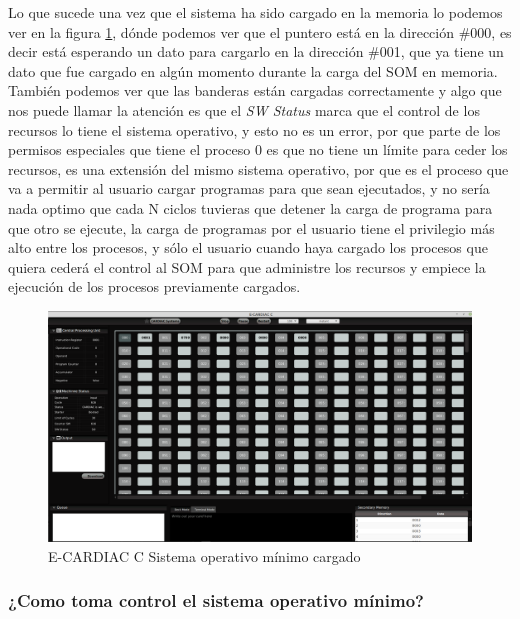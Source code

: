 \documentclass[letterpaper,12pt,oneside]{book}
\begin{document}
		Lo que sucede una vez que el sistema ha sido cargado en la memoria lo podemos ver en la figura \ref{fig:eccSOMcargado}, dónde podemos ver que el
		puntero está en la dirección \#000, es decir está esperando un dato para cargarlo en la dirección \#001, que ya tiene un dato que fue cargado
		en algún momento durante la carga del SOM en memoria. También podemos ver que las banderas están cargadas correctamente y algo que nos puede llamar la atención
		es que el \textit{SW Status} marca que el control de los recursos lo tiene el sistema operativo, y esto no es un error, por que parte de los permisos especiales
		que tiene el proceso 0 es que no tiene un límite para ceder los recursos, es una extensión del mismo sistema operativo, por que es el proceso que va a permitir
		al usuario cargar programas para que sean ejecutados, y no sería nada optimo que cada N ciclos tuvieras que detener la carga de programa para que otro se ejecute,
		la carga de programas por el usuario tiene el privilegio más alto entre los procesos, y sólo el usuario cuando haya cargado los procesos
		que quiera cederá el control al SOM para que administre los recursos y empiece la ejecución de los procesos previamente cargados.
		
		\begin{figure}[h]		
			\centering
			\includegraphics[scale=0.25]{media/CARDIACC/ECARDIACC_socargado.png}
			\caption{E-CARDIAC C Sistema operativo mínimo cargado}
			\label{fig:eccSOMcargado}
		\end{figure}
		
		
		\subsubsection{¿Como toma control el sistema operativo mínimo?}
		
\end{document}
